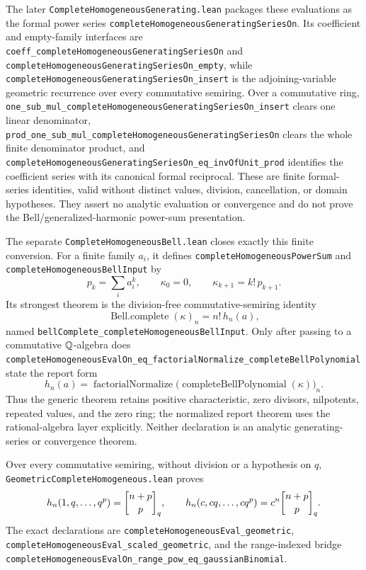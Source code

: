 \documentclass[11pt,oneside]{article}
\theoremstyle{definition}
\theoremstyle{remark}
\begin{document}
The later \nolinkurl{CompleteHomogeneousGenerating.lean} packages these
evaluations as the formal power series
\nolinkurl{completeHomogeneousGeneratingSeriesOn}.  Its coefficient and
empty-family interfaces are
\nolinkurl{coeff_completeHomogeneousGeneratingSeriesOn} and
\nolinkurl{completeHomogeneousGeneratingSeriesOn_empty}, while
\nolinkurl{completeHomogeneousGeneratingSeriesOn_insert} is the
adjoining-variable geometric recurrence over every commutative semiring.
Over a commutative ring,
\nolinkurl{one_sub_mul_completeHomogeneousGeneratingSeriesOn_insert} clears
one linear denominator,
\nolinkurl{prod_one_sub_mul_completeHomogeneousGeneratingSeriesOn} clears the
whole finite denominator product, and
\nolinkurl{completeHomogeneousGeneratingSeriesOn_eq_invOfUnit_prod}
identifies the coefficient series with its canonical formal reciprocal.
These are finite formal-series identities, valid without distinct values,
division, cancellation, or domain hypotheses.  They assert no analytic
evaluation or convergence and do not prove the Bell/generalized-harmonic
power-sum presentation.

The separate \nolinkurl{CompleteHomogeneousBell.lean} closes exactly this
finite conversion.  For a finite family \(a_i\), it defines
\nolinkurl{completeHomogeneousPowerSum} and
\nolinkurl{completeHomogeneousBellInput} by
\[
 p_k=\sum_i a_i^k,\qquad \kappa_0=0,\qquad
 \kappa_{k+1}=k!\,p_{k+1}.
\]
Its strongest theorem is the division-free commutative-semiring identity
\[
 \operatorname{Bell.complete}(\kappa)_n=n!\,h_n(a),
\]
named \nolinkurl{bellComplete_completeHomogeneousBellInput}.  Only after
passing to a commutative \(\mathbb{Q}\)-algebra does
\nolinkurl{completeHomogeneousEvalOn_eq_factorialNormalize_completeBellPolynomial}
state the report form
\[
 h_n(a)=\operatorname{factorialNormalize}
   \bigl(\operatorname{completeBellPolynomial}(\kappa)\bigr)_n.
\]
Thus the generic theorem retains positive characteristic, zero divisors,
nilpotents, repeated values, and the zero ring; the normalized report theorem
uses the rational-algebra layer explicitly.  Neither declaration is an
analytic generating-series or convergence theorem.

Over every commutative semiring, without division or a hypothesis on \(q\),
\nolinkurl{GeometricCompleteHomogeneous.lean} proves
\[
  h_n(1,q,\ldots,q^p)=\GaussianBinomial{n+p}{p}{q},
  \qquad
  h_n(c,cq,\ldots,cq^p)=c^n\GaussianBinomial{n+p}{p}{q}.
\]
The exact declarations are
\nolinkurl{completeHomogeneousEval_geometric},
\nolinkurl{completeHomogeneousEval_scaled_geometric}, and the range-indexed
bridge
\nolinkurl{completeHomogeneousEvalOn_range_pow_eq_gaussianBinomial}.
\end{document}
